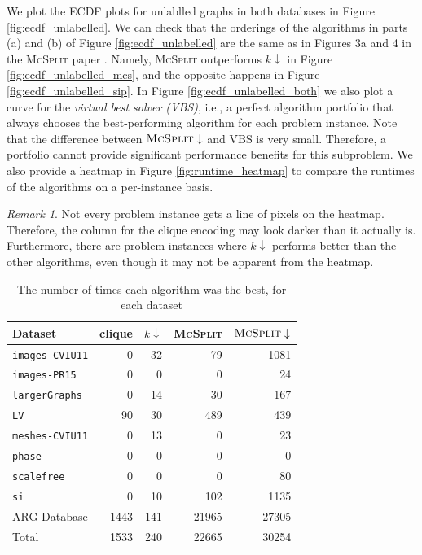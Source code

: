 \documentclass{l4proj}
\theoremstyle{definition}
\theoremstyle{remark}
\newtheorem{remark}{Remark}[chapter]
\begin{document}
We plot the ECDF plots for unlablled graphs in both databases in Figure
\ref{fig:ecdf_unlabelled}. We can check that the orderings of the algorithms in
parts (a) and (b) of Figure \ref{fig:ecdf_unlabelled} are the same as in Figures
3a and 4 in the \textsc{McSplit} paper \cite{DBLP:conf/ijcai/McCreeshPT17}.
Namely, \textsc{McSplit} outperforms $k\downarrow$ in Figure
\ref{fig:ecdf_unlabelled_mcs}, and the opposite happens in Figure
\ref{fig:ecdf_unlabelled_sip}. In Figure \ref{fig:ecdf_unlabelled_both} we also
plot a curve for the \emph{virtual best solver (VBS)}, i.e., a perfect algorithm
portfolio that always chooses the best-performing algorithm for each problem
instance. Note that the difference between $\textsc{McSplit}\downarrow$ and VBS
is very small. Therefore, a portfolio cannot provide significant performance
benefits for this subproblem. We also provide a heatmap in Figure
\ref{fig:runtime_heatmap} to compare the runtimes of the algorithms on a
per-instance basis.

\begin{remark}
  Not every problem instance gets a line of pixels on the heatmap. Therefore,
  the column for the clique encoding may look darker than it actually is.
  Furthermore, there are problem instances where $k\downarrow$ performs better
  than the other algorithms, even though it may not be apparent from the heatmap.
\end{remark}

\begin{table}
  \centering
  \begin{tabular}{l r r r r}
    Dataset & clique & $k\downarrow$ & \textsc{McSplit} & $\textsc{McSplit}\downarrow$ \\
    \hline
    \texttt{images-CVIU11} & 0 & 32 & 79 & 1081 \\
    \texttt{images-PR15} & 0 & 0 & 0 & 24 \\
    \texttt{largerGraphs} & 0 & 14 & 30 & 167 \\
    \texttt{LV} & 90 & 30 & 489 & 439 \\
    \texttt{meshes-CVIU11} & 0 & 13 & 0 & 23 \\
    \texttt{phase} & 0 & 0 & 0 & 0 \\
    \texttt{scalefree} & 0 & 0 & 0 & 80 \\
    \texttt{si} & 0 & 10 & 102 & 1135 \\
    ARG Database & 1443 & 141 & 21965 & 27305 \\
    \hline
    Total & 1533 & 240 & 22665 & 30254
  \end{tabular}
  \caption{The number of times each algorithm was the best, for each dataset}
  \label{table:best}
\end{table}
\end{document}
